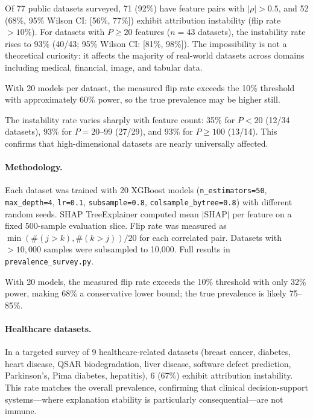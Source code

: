 \documentclass{article}
\begin{document}
Of 77 public datasets surveyed, 71 (92\%) have feature pairs with $|\rho| > 0.5$, and 52 (68\%, 95\% Wilson CI: [56\%, 77\%]) exhibit attribution instability (flip rate $> 10\%$). For datasets with $P \geq 20$ features ($n = 43$ datasets), the instability rate rises to 93\% (40/43; 95\% Wilson CI: [81\%, 98\%]). The impossibility is not a theoretical curiosity: it affects the majority of real-world datasets across domains including medical, financial, image, and tabular data.

With 20 models per dataset, the measured flip rate exceeds the 10\% threshold with approximately 60\% power, so the true prevalence may be higher still.

The instability rate varies sharply with feature count: 35\% for $P < 20$ (12/34 datasets), 93\% for $P = 20$--$99$ (27/29), and 93\% for $P \geq 100$ (13/14). This confirms that high-dimensional datasets are nearly universally affected.

\paragraph{Methodology.}
\begin{sloppypar}
Each dataset was trained with 20 XGBoost models (\texttt{n\_estimators=50},
\texttt{max\_depth=4}, \texttt{lr=0.1}, \texttt{subsample=0.8},
\texttt{colsample\_bytree=0.8}) with different random seeds. SHAP TreeExplainer
computed mean $|\text{SHAP}|$ per feature on a fixed 500-sample evaluation slice.
Flip rate was measured as $\min(\#(j{>}k), \#(k{>}j)) / 20$ for each correlated
pair. Datasets with $> 10{,}000$ samples were subsampled to 10{,}000. Full results
in \texttt{prevalence\_survey.py}.
\end{sloppypar}

With 20 models, the measured flip rate exceeds the 10\% threshold with only 32\% power, making 68\% a conservative lower bound; the true prevalence is likely 75--85\%.

\paragraph{Healthcare datasets.}
In a targeted survey of 9 healthcare-related datasets (breast cancer, diabetes, heart disease, QSAR biodegradation, liver disease, software defect prediction, Parkinson's, Pima diabetes, hepatitis), 6 (67\%) exhibit attribution instability. This rate matches the overall prevalence, confirming that clinical decision-support systems---where explanation stability is particularly consequential---are not immune.
\end{document}
